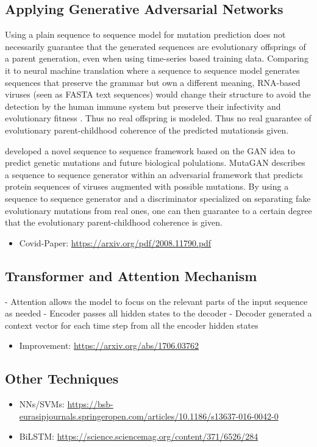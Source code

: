 \subsection{Applying Generative Adversarial Networks} \label{fundamentalsF}

Using a plain sequence to sequence model for mutation prediction does not necessarily guarantee that the generated sequences are evolutionary offsprings of a parent generation, even when using time-series based training data. Comparing it to neural machine translation where a sequence to sequence model generates sequences that preserve the grammar but own a different meaning, \ac{RNA}-based viruses (seen as FASTA text sequences) would change their structure to avoid the detection by the human immune system but preserve their infectivity and evolutionary fitness \cite{Hie2021}. Thus no real offspring is modeled. Thus no real guarantee of evolutionary parent-childhood coherence of the predicted \glqq mutations\grqq is given.

\cite{Berman2020} developed a novel sequence to sequence framework based on the \ac{GAN} idea to predict genetic mutations and future biological polulations. MutaGAN describes a sequence to sequence generator within an adversarial framework that predicts protein sequences of viruses augmented with possible mutations. By using a sequence to sequence generator and a discriminator specialized on separating fake evolutionary mutations from real ones, one can then guarantee to a certain degree that the evolutionary parent-childhood coherence is given. \cite{Berman2020}

\begin{itemize}
	\item Covid-Paper: \url{https://arxiv.org/pdf/2008.11790.pdf}
\end{itemize}


\subsection{Transformer and Attention Mechanism} \label{fundamentalsG}

- Attention allows the model to focus on the relevant parts of the input sequence as needed
- Encoder passes all hidden states to the decoder
- Decoder generated a context vector for each time step from all the encoder hidden states

\begin{itemize}
	\item Improvement: \url{https://arxiv.org/abs/1706.03762}
\end{itemize}


\subsection{Other Techniques} \label{fundamentalsH}

\begin{itemize}
	\item NNs/SVMs: \url{https://bsb-eurasipjournals.springeropen.com/articles/10.1186/s13637-016-0042-0}
	\item BiLSTM: \url{https://science.sciencemag.org/content/371/6526/284}
\end{itemize}


\newpage
